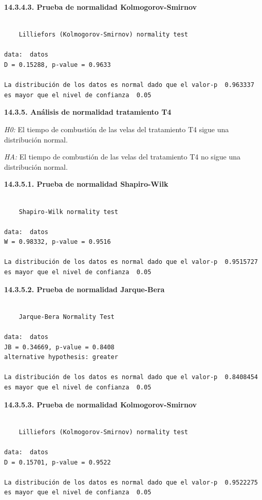 \documentclass[
  letterpaper,
  DIV=11,
  numbers=noendperiod]{scrartcl}
\begin{document}
\textbf{14.3.4.3. Prueba de normalidad Kolmogorov-Smirnov}

\begin{verbatim}

    Lilliefors (Kolmogorov-Smirnov) normality test

data:  datos
D = 0.15288, p-value = 0.9633

La distribución de los datos es normal dado que el valor-p  0.963337  es mayor que el nivel de confianza  0.05
\end{verbatim}

\textbf{14.3.5. Análisis de normalidad tratamiento T4}

\emph{H0:} El tiempo de combustión de las velas del tratamiento T4 sigue
una distribución normal.

\emph{HA:} El tiempo de combustión de las velas del tratamiento T4 no
sigue una distribución normal.

\textbf{14.3.5.1. Prueba de normalidad Shapiro-Wilk}

\begin{verbatim}

    Shapiro-Wilk normality test

data:  datos
W = 0.98332, p-value = 0.9516

La distribución de los datos es normal dado que el valor-p  0.9515727  es mayor que el nivel de confianza  0.05
\end{verbatim}

\textbf{14.3.5.2. Prueba de normalidad Jarque-Bera}

\begin{verbatim}

    Jarque-Bera Normality Test

data:  datos
JB = 0.34669, p-value = 0.8408
alternative hypothesis: greater

La distribución de los datos es normal dado que el valor-p  0.8408454  es mayor que el nivel de confianza  0.05
\end{verbatim}

\textbf{14.3.5.3. Prueba de normalidad Kolmogorov-Smirnov}

\begin{verbatim}

    Lilliefors (Kolmogorov-Smirnov) normality test

data:  datos
D = 0.15701, p-value = 0.9522

La distribución de los datos es normal dado que el valor-p  0.9522275  es mayor que el nivel de confianza  0.05
\end{verbatim}
\end{document}
